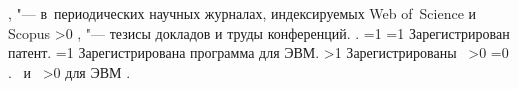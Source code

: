             ,  "--- в~периодических научных журналах, индексируемых Web of~Science и Scopus\sloppy%
        \fi%
        \ifnum \value{citeauthorconf}>0%
            ,  "--- тезисы докладов и труды конференций.
        \else%
            .
        \fi%
        \ifnum \value{citeregistered}=1%
           \ifnum \value{citeauthorpatent}=1%
               Зарегистрирован  патент.
           \fi%
           \ifnum \value{citeauthorprogram}=1%
               Зарегистрирована  программа для ЭВМ.
           \fi%
        \fi%
        \ifnum \value{citeregistered}>1%
           Зарегистрированы\ %
           \ifnum \value{citeauthorpatent}>0%
            \cite{patbib1}\sloppy%
           \ifnum \value{citeauthorprogram}=0 . \else \ и~\fi%
           \fi%
           \ifnum \value{citeauthorprogram}>0%
            для ЭВМ \cite{progbib1}.
           \fi%
        \fi%
  

